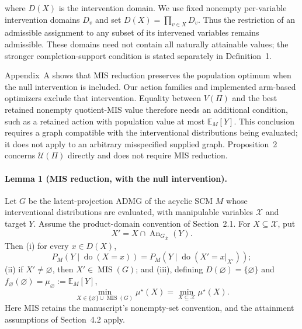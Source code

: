 
where $D(X)$ is the intervention domain. We use fixed nonempty per-variable
intervention domains $D_v$ and set $D(X)=\prod_{v\in X}D_v$.
Thus the restriction of an admissible assignment to any subset of its
intervened variables remains admissible. These domains need not contain
all naturally attainable values; the stronger completion-support condition
is stated separately in Definition~1.

Appendix~A shows that MIS reduction preserves the population optimum when
the null intervention is included. Our action families and implemented
arm-based optimizers exclude that intervention. Equality between $V(\Pi)$
and the best retained nonempty quotient-MIS value therefore needs an
additional condition, such as a retained action with population value at
most $\mathbb E_M[Y]$. This conclusion requires a graph compatible with the
interventional distributions being evaluated; it does not apply to an
arbitrary misspecified supplied graph. Proposition~2 concerns $\mathcal U(\Pi)$
directly and does not require MIS reduction.

\paragraph{Lemma 1 (MIS reduction, with the null intervention).}
Let $G$ be the latent-projection ADMG of the acyclic SCM $M$ whose
interventional distributions are evaluated, with manipulable variables
$\mathcal X$ and target $Y$. Assume the product-domain convention of
Section~2.1. For $X\subseteq\mathcal X$, put
\[
 X'=X\cap\operatorname{An}_{G_{\overline X}}(Y).
\]
Then (i) for every $x\in D(X)$,
\[
 P_M(Y\mid\operatorname{do}(X=x))
 =P_M(Y\mid\operatorname{do}(X'=x|_{X'}));
\]
(ii) if $X'\ne\varnothing$, then $X'\in\operatorname{MIS}(G)$;
and (iii), defining $D(\varnothing)=\{\varnothing\}$ and
$f_{\varnothing}(\varnothing)=\mu_{\varnothing}:=\mathbb E_M[Y]$,
\[
 \min_{X\in\{\varnothing\}\cup\operatorname{MIS}(G)}\mu^\star(X)
 =\min_{X\subseteq\mathcal X}\mu^\star(X).
\]
Here MIS retains the manuscript's nonempty-set convention, and the
attainment assumptions of Section~4.2 apply.

